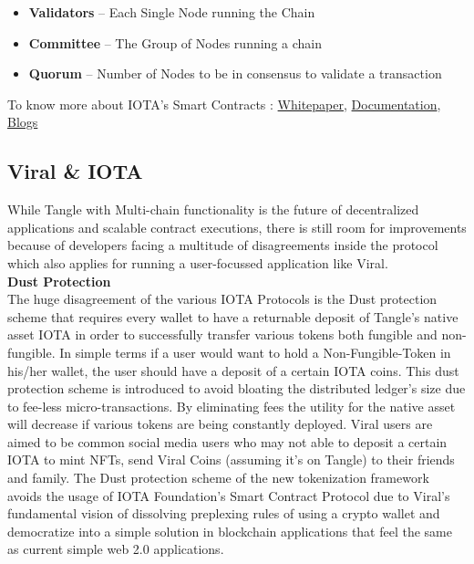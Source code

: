 \documentclass[conference]{IEEEtran}
\begin{document}
\begin{itemize}[wide, labelwidth=!, labelindent=0pt]
\item \textbf{Validators} – Each Single Node running the Chain
\item \textbf{Committee} – The Group of Nodes running a chain
\item \textbf{Quorum} – Number of Nodes to be in consensus to validate a transaction
\end{itemize}

To know more about IOTA's Smart Contracts : \hyperlink{https://files.iota.org/papers/ISC_WP_Nov_10_2021.pdf}{Whitepaper}, \hyperlink{https://wiki.iota.org/smart-contracts/overview}{Documentation}, \hyperlink{https://blog.iota.org/iota-smart-contracts-beta-release/}{Blogs}\\

\subsection{\textbf{Viral \& IOTA}}

While Tangle with Multi-chain functionality is the future of decentralized applications and scalable contract executions, there is still room for improvements because of developers facing a multitude of disagreements inside the protocol which also applies for running a user-focussed application like Viral. \\

\textbf{Dust Protection}\\

The huge disagreement of the various IOTA Protocols is the Dust protection scheme that requires every wallet to have a returnable deposit of Tangle's native asset IOTA in order to successfully transfer various tokens both fungible and non-fungible. In simple terms if a user would want to hold a Non-Fungible-Token in his/her wallet, the user should have a deposit of a certain IOTA coins. This dust protection scheme is introduced to avoid bloating the distributed ledger's size due to fee-less micro-transactions. By eliminating fees the utility for the native asset will decrease if various tokens are being constantly deployed. Viral users are aimed to be common social media users who may not able to deposit a certain IOTA to mint NFTs, send Viral Coins (assuming it's on Tangle) to their friends and family. The Dust protection scheme of the new tokenization framework avoids the usage of IOTA Foundation's Smart Contract Protocol due to Viral's fundamental vision of dissolving preplexing rules of using a crypto wallet and democratize into a simple solution in blockchain applications that feel the same as current simple web 2.0 applications.
\end{document}
